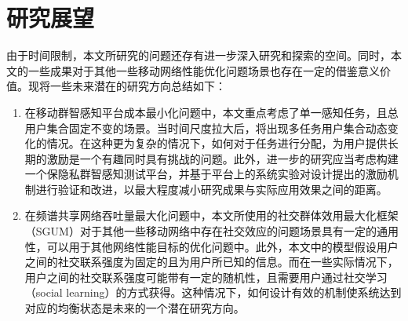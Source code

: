 \section{研究展望}
由于时间限制，本文所研究的问题还存有进一步深入研究和探索的空间。同时，本文的一些成果对于其他一些移动网络性能优化问题场景也存在一定的借鉴意义价值。现将一些未来潜在的研究方向总结如下：

\begin{enumerate}
    \item 在移动群智感知平台成本最小化问题中，本文重点考虑了单一感知任务，且总用户集合固定不变的场景。当时间尺度拉大后，将出现多任务用户集合动态变化的情况。在这种更为复杂的情况下，如何对于任务进行分配，为用户提供长期的激励是一个有趣同时具有挑战的问题。此外，进一步的研究应当考虑构建一个保隐私群智感知测试平台，并基于平台上的系统实验对设计提出的激励机制进行验证和改进，以最大程度减小研究成果与实际应用效果之间的距离。
    \item 在频谱共享网络吞吐量最大化问题中，本文所使用的社交群体效用最大化框架（SGUM）对于其他一些移动网络中存在社交效应的问题场景具有一定的通用性，可以用于其他网络性能目标的优化问题中。此外，本文中的模型假设用户之间的社交联系强度为固定的且为用户所已知的信息。而在一些实际情况下，用户之间的社交联系强度可能带有一定的随机性，且需要用户通过社交学习（social learning）的方式获得。这种情况下，如何设计有效的机制使系统达到对应的均衡状态是未来的一个潜在研究方向。

\end{enumerate}
